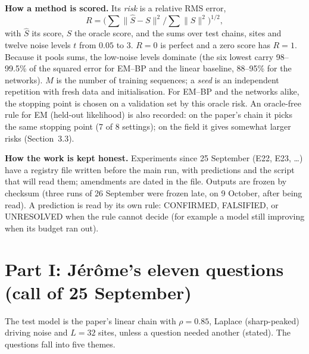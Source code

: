 \documentclass[11pt,a4paper]{article}
\begin{document}
\textbf{How a method is scored.} Its \emph{risk} is a relative RMS error,
\[ R=\Big(\textstyle\sum\|\hat S-S\|^2\big/\sum\|S\|^2\Big)^{1/2}, \]
with $\hat S$ its score, $S$ the oracle score, and the sums over test chains, sites and twelve noise levels $t$ from $0.05$ to $3$.
$R=0$ is perfect and a zero score has $R=1$. Because it pools sums, the low-noise levels dominate (the six lowest carry 98--99.5\% of
the squared error for EM--BP and the linear baseline, 88--95\% for the networks). $M$ is the number of training sequences; a
\emph{seed} is an independent repetition with fresh data and initialisation. For EM--BP and the networks alike, the stopping point is
chosen on a validation set by this oracle risk. An oracle-free rule for EM (held-out likelihood) is also recorded: on the paper's
chain it picks the same stopping point (7 of 8 settings); on the field it gives somewhat larger risks (Section~3.3).

\textbf{How the work is kept honest.} Experiments since 25 September (E22, E23, \dots) have a registry file written before the main
run, with predictions and the script that will read them; amendments are dated in the file. Outputs are frozen by checksum (three
runs of 26 September were frozen late, on 9 October, after being read). A prediction is read by its own rule: CONFIRMED,
FALSIFIED, or UNRESOLVED when the rule cannot decide (for example a model still improving when its budget ran out).



\section{Part I: Jérôme's eleven questions (call of 25 September)}

The test model is the paper's linear chain with $\rho=0.85$, Laplace (sharp-peaked) driving noise and $L=32$ sites, unless a
question needed another (stated). The questions fall into five themes.
\end{document}
